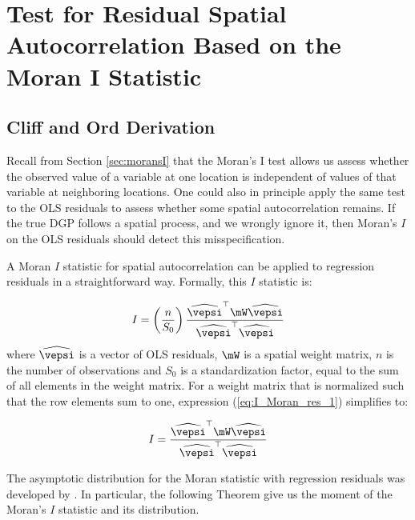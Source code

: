 \documentclass[english,12pt]{book}\usepackage[]{graphicx}\usepackage[]{xcolor}
\begin{document}
\section{Test for Residual Spatial Autocorrelation Based on the Moran I Statistic}


\subsection{Cliff and Ord Derivation}

Recall from Section \ref{sec:moransI} that the Moran's I test allows us assess whether the observed value of a variable at one location is independent of values of that variable at neighboring locations. One could also in principle apply the same test to the OLS residuals to assess whether some spatial autocorrelation remains. If the true DGP follows a spatial process, and we wrongly ignore it, then Moran's $I$ on the OLS residuals should detect this misspecification.

A Moran $I$ statistic for spatial autocorrelation can be applied to regression residuals in a straightforward way. Formally, this $I$ statistic is:

\begin{equation*}
I = \left(\frac{n}{S_0}\right)\frac{\widehat{\vepsi}^\top \mW\widehat{\vepsi}}{\widehat{\vepsi}^\top\widehat{\vepsi}}
\end{equation*}
%
where $\widehat{\vepsi}$ is a vector of OLS residuals, $\mW$ is a spatial weight matrix, $n$ is the number of observations and $S_0$ is a standardization factor, equal to the sum of all elements in the weight matrix. For a weight matrix that is normalized such that the row elements sum to one, expression (\ref{eq:I_Moran_res_1}) simplifies to:

\begin{equation}\label{eq:I_Moran_res_2}
I = \frac{\widehat{\vepsi}^\top \mW\widehat{\vepsi}}{\widehat{\vepsi}^\top\widehat{\vepsi}}
\end{equation}

The asymptotic distribution for the Moran statistic with regression residuals was developed by \cite{cliff1972testing, cliff1973spatial}.  In particular, the following Theorem give us the moment of the Moran's $I$ statistic and its distribution.
\end{document}
